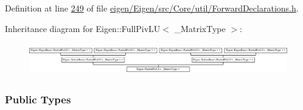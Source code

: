 Definition at line \hyperlink{eigen_2_eigen_2src_2_core_2util_2_forward_declarations_8h_source_l00249}{249} of file \hyperlink{eigen_2_eigen_2src_2_core_2util_2_forward_declarations_8h_source}{eigen/\+Eigen/src/\+Core/util/\+Forward\+Declarations.\+h}.

Inheritance diagram for Eigen\+:\+:Full\+Piv\+LU$<$ \+\_\+\+Matrix\+Type $>$\+:\begin{figure}[H]
\begin{center}
\leavevmode
\includegraphics[height=1.423729cm]{group___l_u___module}
\end{center}
\end{figure}
\subsubsection*{Public Types}
